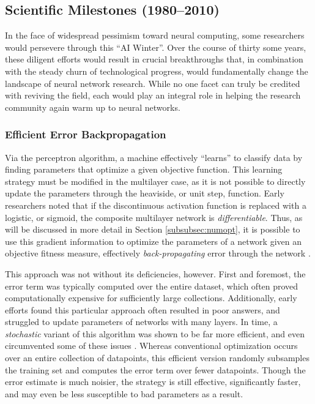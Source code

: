 \subsection{Scientific Milestones (1980--2010)}
\label{sec:advances}

In the face of widespread pessimism toward neural computing, some researchers would persevere through this ``AI Winter''.
Over the course of thirty some years, these diligent efforts would result in crucial breakthroughs that, in combination with the steady churn of technological progress, would fundamentally change the landscape of neural network research.
While no one facet can truly be credited with reviving the field, each would play an integral role in helping the research community again warm up to neural networks.

\subsubsection{Efficient Error Backpropagation}
\label{subsec:sgd}

Via the perceptron algorithm, a machine effectively ``learns'' to classify data by finding parameters that optimize a given objective function.
This learning strategy must be modified in the multilayer case, as it is not possible to directly update the parameters through the heaviside, or unit step, function.
Early researchers noted that if the discontinuous activation function is replaced with a logistic, or sigmoid, the composite multilayer network is \emph{differentiable}.
Thus, as will be discussed in more detail in Section \ref{subsubsec:numopt}, it is possible to use this gradient information to optimize the parameters of a network given an objective fitness measure, effectively \emph{back-propagating} error through the network \cite{Hinton1986Learning}.

This approach was not without its deficiencies, however.
First and foremost, the error term was typically computed over the entire dataset, which often proved computationally expensive for sufficiently large collections.
Additionally, early efforts found this particular approach often resulted in poor answers, and struggled to update parameters of networks with many layers.
In time, a \emph{stochastic} variant of this algorithm was shown to be far more efficient, and even circumvented some of these issues \cite{LeCun1998Efficient}.
Whereas conventional optimization occurs over an entire collection of datapoints, this efficient version randomly subsamples the training set and computes the error term over fewer datapoints.
Though the error estimate is much noisier, the strategy is still effective, significantly faster, and may even be less susceptible to bad parameters as a result.

